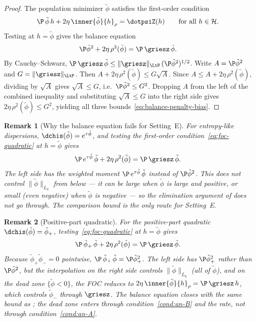 \documentclass{article}
\newtheorem{remark}{Remark}[section]
\begin{document}
\begin{proof}
The population minimizer $\tilde\phi$ satisfies
the first-order condition
\begin{equation}\label{eq:foc-quadratic}
\P\,\tilde\phi\,h
  + 2\eta\,\inner{\tilde\phi}{h}_\rho
  = \dotpsiZ(h)
  \qquad \text{for all } h \in \mathcal{H}.
\end{equation}
Testing at $h = \tilde\phi$
gives the balance equation
\begin{equation}
\label{eq:balance-equation}
\P\tilde\phi^2
  + 2\eta\,\rho^2(\tilde\phi)
  = \P\,\griesz\,\tilde\phi.
\end{equation}
By Cauchy--Schwarz,
$\P\,\griesz\,\tilde\phi
  \le \|\griesz\|_{\LtP}\,
  (\P\tilde\phi^2)^{1/2}$.
Write $A = \P\tilde\phi^2$
and $G = \|\griesz\|_{\LtP}$.
Then $A + 2\eta\,\rho^2(\tilde\phi)
  \le G\sqrt{A}$.
Since $A \le A + 2\eta\,\rho^2(\tilde\phi)$,
dividing by $\sqrt{A}$ gives
$\sqrt{A} \le G$,
i.e.\ $\P\tilde\phi^2 \le G^2$.
Dropping $A$ from the left
of the combined inequality
and substituting $\sqrt{A} \le G$
into the right side gives
$2\eta\,\rho^2(\tilde\phi) \le G^2$,
yielding all three
bounds~\eqref{eq:balance-penalty-bias}.
\end{proof}

\begin{remark}[Why the balance equation fails for Setting~E]
\label{rem:balance-fails-E}
For entropy-like dispersions,
$\dchis(\tilde\phi) = e^{\tau\tilde\phi}$,
and testing the first-order condition~\eqref{eq:foc-quadratic}
at $h = \tilde\phi$ gives
\[
\P\,e^{\tau\tilde\phi}\,\tilde\phi
  + 2\eta\,\rho^2(\tilde\phi)
  = \P\,\griesz\,\tilde\phi.
\]
The left side has the weighted moment
$\P\,e^{\tau\tilde\phi}\,\tilde\phi$
instead of $\P\tilde\phi^2$.
This does not control
$\|\tilde\phi\|_{L_2}$ from below
--- it can be large
when $\tilde\phi$ is large and positive,
or small (even negative)
when $\tilde\phi$ is negative ---
so the elimination argument
of 
does not go through.
The comparison bound
is the only route for Setting~E.
\end{remark}

\begin{remark}[Positive-part quadratic]
\label{rem:positive-part-penalty-bias}
For the positive-part quadratic
$\dchis(\tilde\phi) = \tilde\phi_+$,
testing~\eqref{eq:foc-quadratic}
at $h = \tilde\phi$ gives
\[
\P\,\tilde\phi_+\,\tilde\phi
  + 2\eta\,\rho^2(\tilde\phi)
  = \P\,\griesz\,\tilde\phi.
\]
Because $\tilde\phi_+ \tilde\phi_- = 0$ pointwise,
$\P\,\tilde\phi_+\,\tilde\phi
  = \P\tilde\phi_+^2$.
The left side
has $\P\tilde\phi_+^2$
rather than $\P\tilde\phi^2$,
but the interpolation on the right side
controls $\|\tilde\phi\|_{L_q}$
(all of $\tilde\phi$),
and on the dead zone $\{\tilde\phi < 0\}$,
the FOC reduces to
$2\eta\,\inner{\tilde\phi}{h}_\rho
  = \P\,\griesz\,h$,
which controls $\tilde\phi_-$ through $\griesz$.
The balance equation
closes with the same bound
as ;
the dead zone enters
through condition~\ref{cond:an-B} and the rate,
not through condition~\ref{cond:an-A}.
\end{remark}
\end{document}
